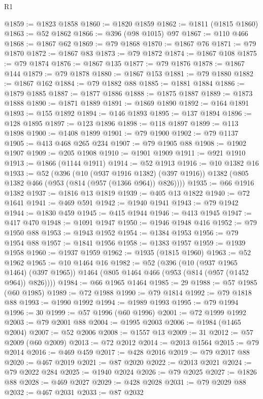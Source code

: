 \begin{lexlean}{R1}
\begin{coremodule}
@1859 := @1823 @1858
@1860 := @1820 @1859
@1862 := @1811 (@1815 @1860)
@1863 := @52 @1862
@1866 := @396 (@98 @1015) @97
@1867 := @110 @466
@1868 := @1867 @62
@1869 := @79 @1868
@1870 := @1867 @76
@1871 := @79 @1870
@1872 := @1867 @83
@1873 := @79 @1872
@1874 := @1867 @108
@1875 := @79 @1874
@1876 := @1867 @135
@1877 := @79 @1876
@1878 := @1867 @144
@1879 := @79 @1878
@1880 := @1867 @153
@1881 := @79 @1880
@1882 := @1867 @162
@1884 := @79 @1882 @88
@1885 := @1881 @1884
@1886 := @1879 @1885
@1887 := @1877 @1886
@1888 := @1875 @1887
@1889 := @1873 @1888
@1890 := @1871 @1889
@1891 := @1869 @1890
@1892 := @164 @1891
@1893 := @155 @1892
@1894 := @146 @1893
@1895 := @137 @1894
@1896 := @128 @1895
@1897 := @123 @1896
@1898 := @118 @1897
@1899 := @113 @1898
@1900 := @1408 @1899
@1901 := @79 @1900
@1902 := @79 @1137
@1905 := @413 @468 @265 @234
@1907 := @79 @1905 @88
@1908 := @1902 @1907
@1909 := @205 @1908
@1910 := @1901 @1909
@1911 := @921 @1910
@1913 := @1866 (@1144 @1911)
@1914 := @52 @1913
@1916 := @10 @1382 @16
@1933 := @52
    (@396
      (@10 (@937 @1916 @1382) (@397 @1916))
      @1382
      (@805 @1382 @466 (@953 (@814 (@957 (@1366 @964)) @826))))
@1935 := @66 @1916 @1382
@1937 := @1816 @13 @1819
@1939 := @405 @13 @1822
@1940 := @72 @1641
@1941 := @469 @591
@1942 := @1940 @1941
@1943 := @79 @1942
@1944 := @1830 @459
@1945 := @415 @1944
@1946 := @413 @1945
@1947 := @417 @470
@1948 := @1091 @1947
@1950 := @1946 @1948 @416
@1952 := @79 @1950 @88
@1953 := @1943 @1952
@1954 := @1384 @1953
@1956 := @79 @1954 @88
@1957 := @1841 @1956
@1958 := @1383 @1957
@1959 := @1939 @1958
@1960 := @1937 @1959
@1962 := @1935 (@1815 @1960)
@1963 := @52 @1962
@1965 := @10 @1464 @16
@1982 := @52
    (@396
      (@10 (@937 @1965 @1464) (@397 @1965))
      @1464
      (@805 @1464 @466 (@953 (@814 (@957 (@1452 @964)) @826))))
@1984 := @66 @1965 @1464
@1985 := 29
@1988 := @57 @1985 (@60 @1985)
@1989 := @72 @1988
@1990 := @79 @1814
@1992 := @79 @1818 @88
@1993 := @1990 @1992
@1994 := @1989 @1993
@1995 := @79 @1994
@1996 := 30
@1999 := @57 @1996 (@60 @1996)
@2001 := @72 @1999 @1992
@2003 := @79 @2001 @88
@2004 := @1995 @2003
@2006 := @1984 (@1465 @2004)
@2007 := @52 @2006
@2008 := @1557 @13
@2009 := 31
@2012 := @57 @2009 (@60 @2009)
@2013 := @72 @2012
@2014 := @2013 @1564
@2015 := @79 @2014
@2016 := @469 @459
@2017 := @428 @2016
@2019 := @79 @2017 @88
@2020 := @467 @2019
@2021 := @87 @2020
@2022 := @2013 @2021
@2024 := @79 @2022 @284
@2025 := @1940 @2024
@2026 := @79 @2025
@2027 := @1826 @88
@2028 := @469 @2027
@2029 := @428 @2028
@2031 := @79 @2029 @88
@2032 := @467 @2031
@2033 := @87 @2032

\end{coremodule}
\end{lexlean}
